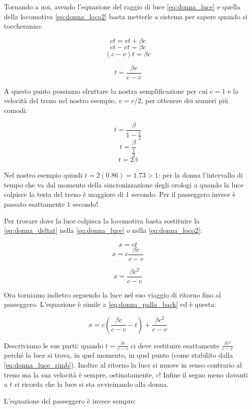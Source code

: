 Tornando a noi, avendo l'equazione del raggio di luce \ref{eq:donna_luce} e quella della locomotiva \ref{eq:donna_loco2} basta metterle a sistema per sapere quando si toccheranno:

$$ ct = vt + \beta c $$
$$ ct - vt =  \beta c $$
$$ (c-v) t =  \beta c $$

\begin{equation} \label{eq:donna_deltat} 
   t = \frac{\beta c}{c-v}
\end{equation}

A questo punto possiamo sfruttare la nostra semplificazione per cui $c=1$ e la velocità del treno nel nostro esempio, $v=c/2$, per ottenere dei numeri più comodi:

$$ t = \frac{\beta}{1-\frac{1}{2}} $$
$$ t = \frac{\beta}{\frac{1}{2}} $$
$$ t = 2\beta $$

Nel nostro esempio quindi $t= 2(0.86)= 1.73 > 1$: per la donna l'intervallo di tempo che va dal momento della sincronizzazione degli orologi a quando la luce colpisce la testa del treno è maggiore di $1$ secondo. Per il passeggero invece è passato esattamente $1$ secondo!

Per trovare dove la luce colpisca la locomotiva basta sostituire la \ref{eq:donna_deltat} nella  \ref{eq:donna_luce} o nella \ref{eq:donna_loco2}:

$$ x = ct $$
$$ x = c \frac{\beta c}{c-v} $$

\begin{equation} \label{eq:donna_luce_rimb} 
  x = \frac{\beta c^2}{c-v}
\end{equation}


Ora torniamo indietro seguendo la luce nel suo viaggio di ritorno fino al passeggero. L'equazione è simile a \ref{eq:donna_palla_back} ed è questa:
 
\begin{equation} \label{eq:donna_luce_back} 
  x = c(\frac{\beta c}{c-v}-t) + \frac{\beta c^2}{c-v}
\end{equation}
 
Descriviamo le sue parti: quando $t=\frac{\beta c}{c-v}$ ci deve restituire esattamente $\frac{\beta c^2}{c-v}$ perché la luce si trova, in quel momento, in quel punto (come stabilito dalla \ref{eq:donna_luce_rimb}). Inoltre al ritorno la luce si muove in senso contrario al treno ma la sua velocità è sempre, ostinatamente, $c$! Infine il segno meno davanti a $t$ ci ricorda che la luce si sta avvicinando alla donna. 

L'equazione del passeggero è invece sempre:

